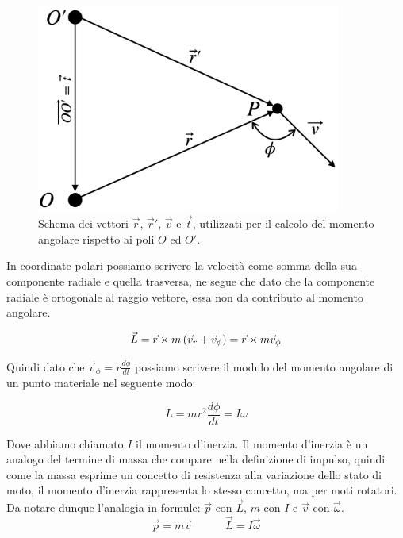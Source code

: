  \begin{figure}[htbp]
\begin{center}
\includegraphics[width=10cm]{images/momang1.png}
\caption{Schema dei vettori $\vec r$, $\vec r'$, $\vec v$ e $\vec t$, utilizzati per il calcolo del momento angolare rispetto ai poli $O$ ed $O'$.}
\end{center}
\end{figure}
In coordinate polari possiamo scrivere la velocità come somma della sua componente radiale e quella trasversa, ne segue che dato che la componente radiale è ortogonale al raggio vettore, essa non da contributo al momento angolare.

\begin{equation}
\vec L = \vec r \times m\left( \vec v_r+\vec v_\phi\right) = \vec r \times m\vec v_\phi
\end{equation}

Quindi dato che $\vec v_\phi = r\frac{d\phi}{dt}$ possiamo scrivere il modulo del momento angolare di un punto materiale nel seguente modo:

\begin{equation}
\boxed{L = mr^2\frac{d\phi}{dt} = I\omega}
\end{equation}

Dove abbiamo chiamato $I$ il momento d'inerzia. Il momento d'inerzia è un analogo del termine di massa che compare nella definizione di impulso, quindi come la massa esprime un concetto di resistenza alla variazione dello stato di moto, il momento d'inerzia rappresenta lo stesso concetto, ma per moti rotatori. Da notare dunque l'analogia in formule: $\vec p$ con $\vec L$, $m$ con $I$ e $\vec v$ con $\vec \omega$.
\begin{equation}
\vec p = m\vec v \quad\quad \quad \vec L = I\vec     \omega
\end{equation} 

